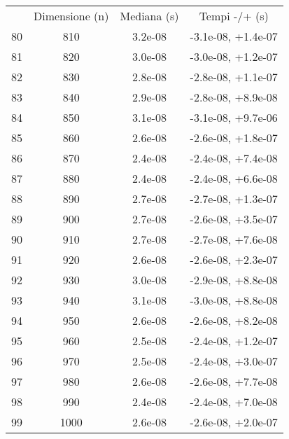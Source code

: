 \begin{table}
\centering
\begin{adjustbox}{width=1\textwidth/2}
\begin{tabular}{|c|c|c|c|}
\hline
 & Dimensione (n) & Mediana (s) & Tempi -/+ (s) \\
80 & 810 & 3.2e-08 & -3.1e-08, +1.4e-07 \\
\cline{1-4}
81 & 820 & 3.0e-08 & -3.0e-08, +1.2e-07 \\
\cline{1-4}
82 & 830 & 2.8e-08 & -2.8e-08, +1.1e-07 \\
\cline{1-4}
83 & 840 & 2.9e-08 & -2.8e-08, +8.9e-08 \\
\cline{1-4}
84 & 850 & 3.1e-08 & -3.1e-08, +9.7e-06 \\
\cline{1-4}
85 & 860 & 2.6e-08 & -2.6e-08, +1.8e-07 \\
\cline{1-4}
86 & 870 & 2.4e-08 & -2.4e-08, +7.4e-08 \\
\cline{1-4}
87 & 880 & 2.4e-08 & -2.4e-08, +6.6e-08 \\
\cline{1-4}
88 & 890 & 2.7e-08 & -2.7e-08, +1.3e-07 \\
\cline{1-4}
89 & 900 & 2.7e-08 & -2.6e-08, +3.5e-07 \\
\cline{1-4}
90 & 910 & 2.7e-08 & -2.7e-08, +7.6e-08 \\
\cline{1-4}
91 & 920 & 2.6e-08 & -2.6e-08, +2.3e-07 \\
\cline{1-4}
92 & 930 & 3.0e-08 & -2.9e-08, +8.8e-08 \\
\cline{1-4}
93 & 940 & 3.1e-08 & -3.0e-08, +8.8e-08 \\
\cline{1-4}
94 & 950 & 2.6e-08 & -2.6e-08, +8.2e-08 \\
\cline{1-4}
95 & 960 & 2.5e-08 & -2.4e-08, +1.2e-07 \\
\cline{1-4}
96 & 970 & 2.5e-08 & -2.4e-08, +3.0e-07 \\
\cline{1-4}
97 & 980 & 2.6e-08 & -2.6e-08, +7.7e-08 \\
\cline{1-4}
98 & 990 & 2.4e-08 & -2.4e-08, +7.0e-08 \\
\cline{1-4}
99 & 1000 & 2.6e-08 & -2.6e-08, +2.0e-07 \\
\cline{1-4}
\end{tabular}
\end{adjustbox}
\end{table}
